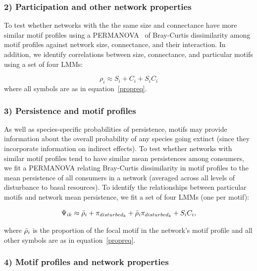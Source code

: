 \documentclass[12pt]{article}
\begin{document}
\begin{spacing}{2.0}
    
    \subsubsection*{2) Participation and other network properties}    

        
        To test whether networks with the the same size and connectance have more similar motif profiles using a PERMANOVA~\citep{Anderson2001} of Bray-Curtis dissimilarity among motif profiles against network size, connectance, and their interaction. 
        In addition, we identify correlations between size, connectance, and particular motifs using a set of four LMMs:
        
        \begin{equation}
            \rho_{i} \approx S_{i} + C_{i} + S_{i}C_{i}
        \end{equation}
        where all symbols are as in equation~\ref{propreq}.
        
    \subsubsection*{3) Persistence and motif profiles}

        As well as species-specific probabilities of persistence, motifs may provide information about the overall probability of any species going extinct (since they incorporate information on indirect effects).
        To test whether networks with similar motif profiles tend to have similar mean persistences among consumers, we fit a PERMANOVA relating Bray-Curtis dissimilarity in motif profiles to the mean persistence of all consumers in a network (averaged across all levels of disturbance to basal resources).
        To identify the relationships between particular motifs and network mean persistence, we fit a set of four LMMs (one per motif):
        
                \begin{equation}
                \Psi_{ik} \approx \Bar{\rho}_{i} + \pi_{disturbed_k} + \Bar{\rho}_{i}\pi_{disturbed_k} +
                S_{i}C_{i} ,
                \label{netpropeq}
            \end{equation}
        
        where $\Bar{\rho}_{i}$ is the proportion of the focal motif in the network's motif profile and all other symbols are as in equation~\ref{propreq}.
            
    \subsubsection*{4) Motif profiles and network properties}
    

\end{spacing}
\end{document}
